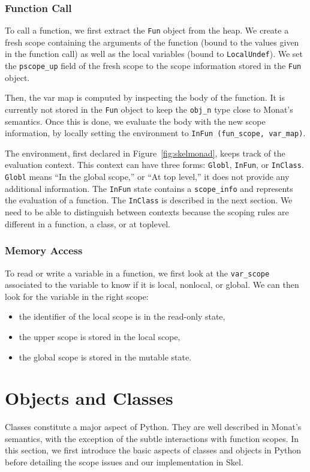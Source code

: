 \documentclass[submission,copyright,creativecommons]{eptcs}
\newcommand{\skinl}[1]{\texttt{#1}}
\begin{document}
\subsubsection{Function Call}
To call a function, we first extract the \skinl{Fun} object from the heap.
We create a fresh scope containing the arguments of the function (bound to the
values given in the function call) as well as the local variables (bound to \skinl{LocalUndef}).
We set the \skinl{pscope_up} field of the fresh scope to the scope information stored in the \skinl{Fun} object.

Then, the var map is computed by inspecting the body of the function. It is currently not stored in the \skinl{Fun} object to keep the \skinl{obj_n} type close to Monat's semantics.
Once this is done, we evaluate the body with the new scope information, by
locally setting the environment to \skinl {InFun (fun_scope, var_map)}.

The environment, first declared in Figure~\ref{fig:skelmonad}, keeps track of the evaluation context.
This context can have three forms: \skinl{Globl}, \skinl{InFun}, or \skinl{InClass}.
\skinl{Globl} means ``In the global scope,'' or ``At top level,'' it does not provide any additional information.
The \skinl{InFun} state contains a \skinl{scope_info} and represents the evaluation of a function.
The \skinl{InClass} is described in the next section.
We need to be able to distinguish between contexts because the scoping rules are different in a function, a class, or at toplevel.

\subsubsection{Memory Access}

To read or write a variable in a function, we first look at the
\skinl{var_scope} associated to the variable to know if it is local, nonlocal, or global.
We can then look for the variable in the right scope:
\begin{itemize}
\item the identifier of the local scope is in the read-only state,
\item the upper scope is stored in the local scope,
\item the global scope is stored in the mutable state.
\end{itemize}

\section{Objects and Classes}\label{sec:objects}
Classes constitute a major aspect of Python. They are well described in Monat's
semantics, with the exception of the subtle interactions with function scopes.
In this section, we first introduce the basic aspects of classes and objects in
Python before detailing the scope issues and our implementation in Skel.
\end{document}
